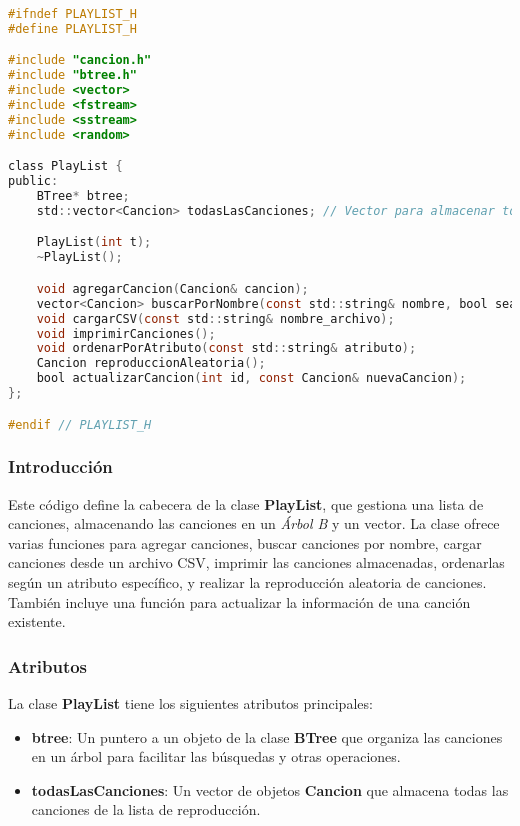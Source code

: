 \documentclass[corference]{IEEEtran}
\begin{document}
\begin{flushleft}
            \begin{lstlisting}[language=C, style=mystyle, caption={Cabecera de la Clase Playlist}]
#ifndef PLAYLIST_H
#define PLAYLIST_H

#include "cancion.h"
#include "btree.h"
#include <vector>
#include <fstream>
#include <sstream>
#include <random>

class PlayList {
public:
    BTree* btree;
    std::vector<Cancion> todasLasCanciones; // Vector para almacenar todas las canciones

    PlayList(int t);
    ~PlayList();

    void agregarCancion(Cancion& cancion);
    vector<Cancion> buscarPorNombre(const std::string& nombre, bool searchByArtist);
    void cargarCSV(const std::string& nombre_archivo);
    void imprimirCanciones();
    void ordenarPorAtributo(const std::string& atributo);
    Cancion reproduccionAleatoria();
    bool actualizarCancion(int id, const Cancion& nuevaCancion);
};

#endif // PLAYLIST_H
            \end{lstlisting}
            \subsubsection{Introducción}
            
                \noindent\hspace*{4em}Este código define la cabecera de la clase \textbf{PlayList}, que gestiona una lista de canciones, almacenando las canciones en un \textit{Árbol B} y un vector. La clase ofrece varias funciones para agregar canciones, buscar canciones por nombre, cargar canciones desde un archivo CSV, imprimir las canciones almacenadas, ordenarlas según un atributo específico, y realizar la reproducción aleatoria de canciones. También incluye una función para actualizar la información de una canción existente.
            
            \subsubsection{Atributos}
            
                \noindent\hspace*{4em}La clase \textbf{PlayList} tiene los siguientes atributos principales:
                
                \begin{itemize}[left=4em]
                    \item \textbf{btree}: Un puntero a un objeto de la clase \textbf{BTree} que organiza las canciones en un árbol para facilitar las búsquedas y otras operaciones.
                    \item \textbf{todasLasCanciones}: Un vector de objetos \textbf{Cancion} que almacena todas las canciones de la lista de reproducción.
                \end{itemize}
            

\end{flushleft}
\end{document}
